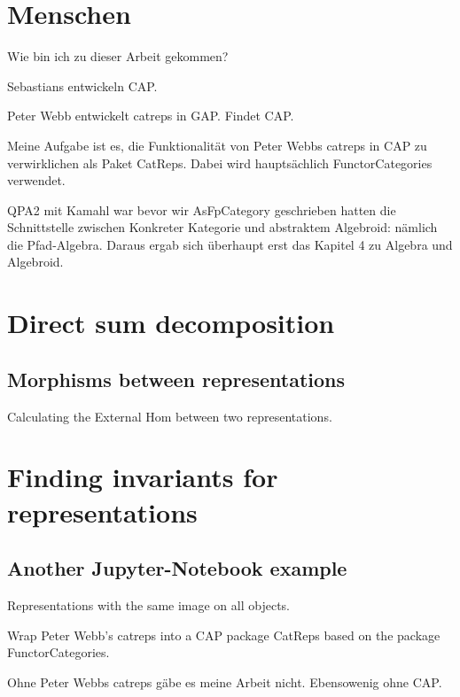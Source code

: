 \documentclass{beamer}
\begin{document}
\section{Menschen}

Wie bin ich zu dieser Arbeit gekommen?

Sebastians entwickeln CAP.

Peter Webb entwickelt catreps in GAP. Findet CAP.

Meine Aufgabe ist es, die Funktionalität von Peter Webbs catreps in CAP
zu verwirklichen als Paket CatReps. Dabei wird hauptsächlich FunctorCategories
verwendet.

QPA2 mit Kamahl war bevor wir AsFpCategory geschrieben hatten die Schnittstelle zwischen
Konkreter Kategorie und abstraktem Algebroid: nämlich die Pfad-Algebra. Daraus ergab sich
überhaupt erst das Kapitel 4 zu Algebra und Algebroid.


\section{Direct sum decomposition}

\subsection{Morphisms between representations}

\begin{frame}
Calculating the External Hom between two representations.
\end{frame}

\section{Finding invariants for representations}

\subsection{Another Jupyter-Notebook example}

\begin{frame}
Representations with the same image on all objects.
\end{frame}



Wrap Peter Webb's catreps into a CAP package CatReps based on the package FunctorCategories.

Ohne Peter Webbs catreps gäbe es meine Arbeit nicht. Ebensowenig ohne CAP.
\end{document}
